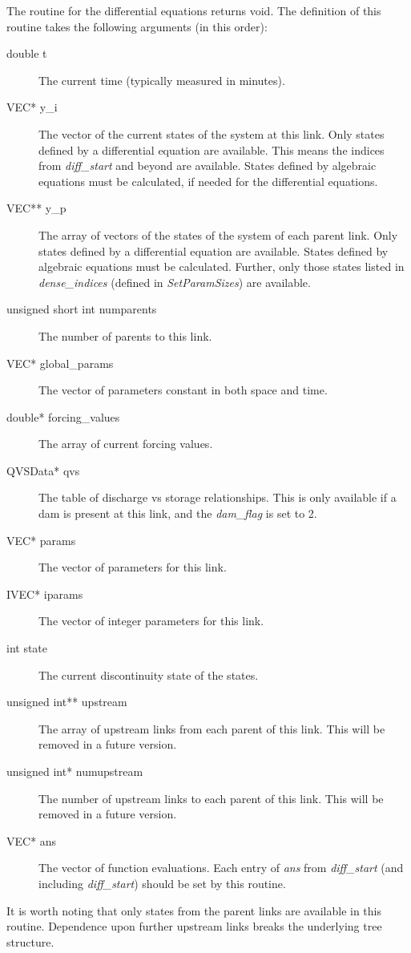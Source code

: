 \documentclass[12pt]{article}
\begin{document}
The routine for the differential equations returns void. The definition of this routine takes the following arguments (in this order):
\begin{description}
 \item[double t] The current time (typically measured in minutes).
 \item[VEC* y\_i] The vector of the current states of the system at this link. Only states defined by a differential equation are available. This means the indices from \emph{diff\_start} and beyond are available. States defined by algebraic equations must be calculated, if needed for the differential equations.
 \item[VEC** y\_p] The array of vectors of the states of the system of each parent link. Only states defined by a differential equation are available. States defined by algebraic equations must be calculated. Further, only those states listed in \emph{dense\_indices} (defined in \emph{SetParamSizes}) are available.
 \item[unsigned short int numparents] The number of parents to this link.
 \item[VEC* global\_params] The vector of parameters constant in both space and time.
 \item[double* forcing\_values] The array of current forcing values.
 \item[QVSData* qvs] The table of discharge vs storage relationships. This is only available if a dam is present at this link, and the \emph{dam\_flag} is set to 2.
 \item[VEC* params] The vector of parameters for this link.
 \item[IVEC* iparams] The vector of integer parameters for this link.
 \item[int state] The current discontinuity state of the states.
 \item[unsigned int** upstream] The array of upstream links from each parent of this link. This will be removed in a future version.
 \item[unsigned int* numupstream] The number of upstream links to each parent of this link. This will be removed in a future version.
 \item[VEC* ans] The vector of function evaluations. Each entry of \emph{ans} from \emph{diff\_start} (and including \emph{diff\_start}) should be set by this routine.
\end{description}

It is worth noting that only states from the parent links are available in this routine. Dependence upon further upstream links breaks the underlying tree structure.
\end{document}
